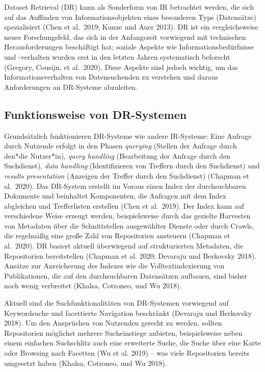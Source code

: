 \documentclass[a4paper,
fontsize=11pt,
oneside,
numbers=noperiodatend,
parskip=half-,
bibliography=totoc,
final
]{scrartcl}
\begin{document}
Dataset Retrieval (DR) kann als Sonderform von IR betrachtet werden, die
sich auf das Auffinden von Informationsobjekten eines besonderen Typs
(Datensätze) spezialisiert (Chen et al.~2019; Kunze und Auer 2013). DR
ist ein vergleichsweise neues Forschungsfeld, das sich in der
Anfangszeit vorwiegend mit technischen Herausforderungen beschäftigt
hat; soziale Aspekte wie Informationsbedürfnisse und -verhalten wurden
erst in den letzten Jahren systematisch beforscht (Gregory, Cousijn, et
al.~2020). Diese Aspekte sind jedoch wichtig, um das
Informationsverhalten von Datensuchenden zu verstehen und daraus
Anforderungen an DR-Systeme abzuleiten.

\hypertarget{funktionsweise-von-dr-systemen}{%
\subsection{Funktionsweise von
DR-Systemen}\label{funktionsweise-von-dr-systemen}}

Grundsätzlich funktionieren DR-Systeme wie andere IR-Systeme: Eine
Anfrage durch Nutzende erfolgt in den Phasen \emph{querying} (Stellen
der Anfrage durch den*die Nutzer*in), \emph{query handling} (Bearbeitung
der Anfrage durch den Suchdienst), \emph{data handling} (Identifizieren
von Treffern durch den Suchdienst) und \emph{results presentation}
(Anzeigen der Treffer durch den Suchdienst) (Chapman et al.~2020). Das
DR-System erstellt im Voraus einen Index der durchsuchbaren Dokumente
und beinhaltet Komponenten, die Anfragen mit dem Index abgleichen und
Trefferlisten erstellen (Chen et al.~2019). Der Index kann auf
verschiedene Weise erzeugt werden, beispielsweise durch das gezielte
Harvesten von Metadaten über die Schnittstellen ausgewählter Dienste
oder durch Crawls, die regelmäßig eine große Zahl von Repositorien
ansteuern (Chapman et al.~2020). DR basiert aktuell überwiegend auf
strukturierten Metadaten, die Repositorien bereitstellen (Chapman et al.
2020; Devaraju und Berkovsky 2018). Ansätze zur Anreicherung des Indexes
wie die Volltextindexierung von Publikationen, die auf den
durchsuchbaren Datensätzen aufbauen, sind bisher noch wenig verbreitet
(Khalsa, Cotroneo, und Wu 2018).

Aktuell sind die Suchfunktionalitäten von DR-Systemen vorwiegend auf
Keywordsuche und facettierte Navigation beschränkt (Devaraju und
Berkovsky 2018). Um den Ansprüchen von Nutzenden gerecht zu werden,
sollten Repositorien möglichst mehrere Sucheinstiege anbieten,
beispielsweise neben einem einfachen Suchschlitz auch eine erweiterte
Suche, die Suche über eine Karte oder Browsing nach Facetten (Wu et al.
2019) -- was viele Repositorien bereits umgesetzt haben (Khalsa,
Cotroneo, und Wu 2018).
\end{document}
